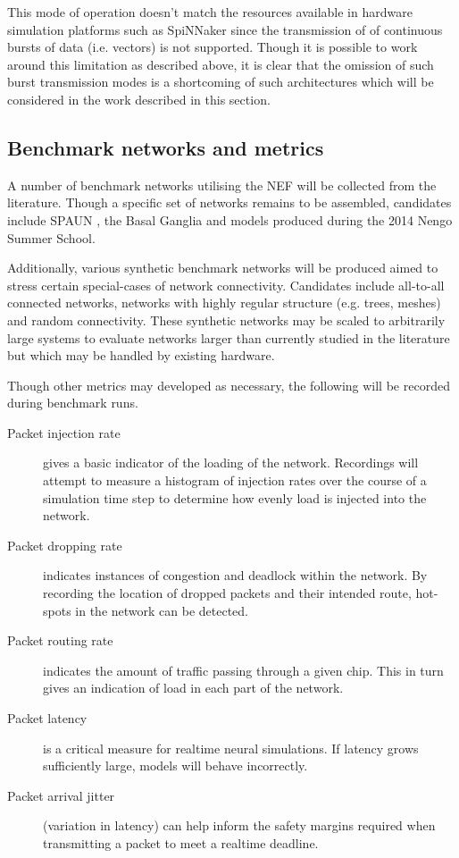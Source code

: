			This mode of operation doesn't match the resources available in hardware
			simulation platforms such as SpiNNaker since the transmission of of
			continuous bursts of data (i.e. vectors) is not supported. Though it is
			possible to work around this limitation as described above, it is clear
			that the omission of such burst transmission modes is a shortcoming of
			such architectures which will be considered in the work described in this
			section.
		
		\subsection{Benchmark networks and metrics}
			
			A number of benchmark networks utilising the NEF will be collected from
			the literature. Though a specific set of networks remains to be assembled,
			candidates include SPAUN \cite{eliasmith12}, the Basal Ganglia
			\cite{stewart12} and models produced during the 2014 Nengo Summer School.
			
			Additionally, various synthetic benchmark networks will be produced aimed
			to stress certain special-cases of network connectivity. Candidates
			include all-to-all connected networks, networks with highly regular
			structure (e.g. trees, meshes) and random connectivity. These synthetic
			networks may be scaled to arbitrarily large systems to evaluate networks
			larger than currently studied in the literature but which may be handled
			by existing hardware.
			
			Though other metrics may developed as necessary, the following
			will be recorded during benchmark runs.
			
			\begin{description}
				
				\item[Packet injection rate] gives a basic indicator of the loading of
				the network. Recordings will attempt to measure a histogram of injection
				rates over the course of a simulation time step to determine how evenly
				load is injected into the network.
				
				\item[Packet dropping rate] indicates instances of congestion and
				deadlock within the network. By recording the location of dropped
				packets and their intended route, hot-spots in the network can be
				detected.
				
				\item[Packet routing rate] indicates the amount of traffic passing
				through a given chip. This in turn gives an indication of load in each
				part of the network.
				
				\item[Packet latency] is a critical measure for realtime neural
				simulations. If latency grows sufficiently large, models will behave
				incorrectly.
				
				\item[Packet arrival jitter] (variation in latency) can help inform the
				safety margins required when transmitting a packet to meet a realtime
				deadline.
				
			\end{description}
			
